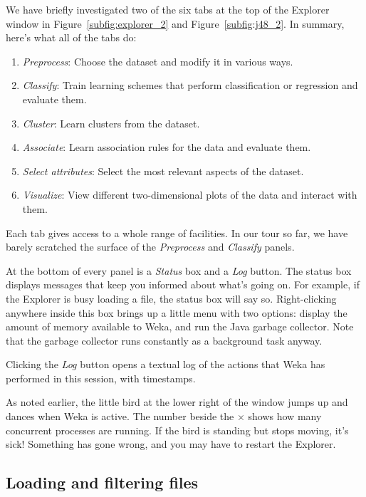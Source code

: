 We have briefly investigated two of the six tabs at the top of the
Explorer window in Figure~\ref{subfig:explorer_2} and
Figure~\ref{subfig:j48_2}. In summary, here's what all of the tabs do:

\begin{enumerate}
\item \textit{Preprocess}: Choose the dataset and modify it in various ways.
\item \textit{Classify}: Train learning schemes that perform classification or regression and evaluate them.
\item \textit{Cluster}: Learn clusters from the dataset.
\item \textit{Associate}: Learn association rules for the data and evaluate them.
\item \textit{Select attributes}: Select the most relevant aspects of the dataset.
\item \textit{Visualize}: View different two-dimensional plots of the data and interact with them.
\end{enumerate}

Each tab gives access to a whole range of facilities. In our tour so
far, we have barely scratched the surface of the \textit{Preprocess}
and \textit{Classify} panels.

At the bottom of every panel is a \textit{Status} box and a
\textit{Log} button. The status box displays messages that keep you
informed about what’s going on. For example, if the Explorer is busy
loading a file, the status box will say so. Right-clicking anywhere
inside this box brings up a little menu with two options: display the
amount of memory available to Weka, and run the Java garbage
collector. Note that the garbage collector runs constantly as a
background task anyway.

Clicking the \textit{Log} button opens a textual log of the actions that Weka
has performed in this session, with timestamps.

As noted earlier, the little bird at the lower right of the window
jumps up and dances when Weka is active. The number beside the $\times$
shows how many concurrent processes are running. If the bird is
standing but stops moving, it’s sick! Something has gone wrong, and
you may have to restart the Explorer.

\subsection{Loading and filtering files}

